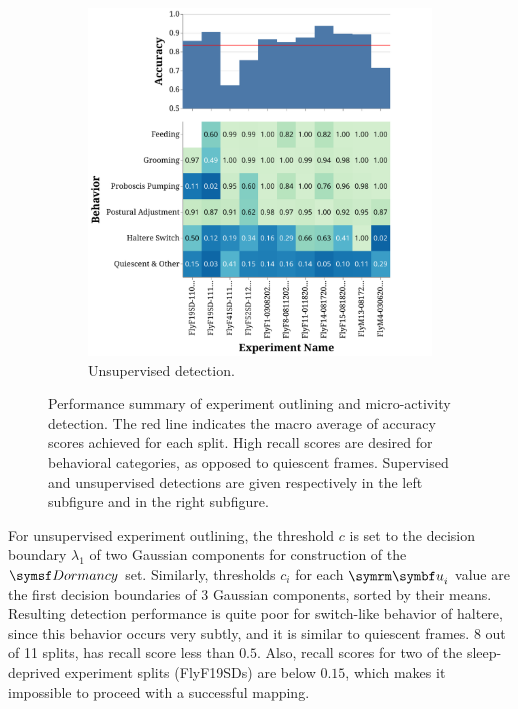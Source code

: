 \begin{figure}[htb!]
\begin{subfigure}[b]{0.495\linewidth}
		\centering\includegraphics[width=\linewidth]{figures/OutliningPerformance-Unsupervised.pdf}
		\caption{Unsupervised detection.}
	\end{subfigure}%
	\caption[Performance summary of experiment outlining and micro-activity detection.]{Performance summary of experiment outlining and micro-activity detection.
		The red line indicates the macro average of accuracy scores achieved for each split.
		High recall scores are desired for behavioral categories, as opposed to quiescent frames.
		Supervised and unsupervised detections are given respectively in the left subfigure and in the right subfigure. \label{figure:outlining-performance}}
\end{figure}

For unsupervised experiment outlining, the threshold $c$ is set to the decision boundary $\lambda_1$ of two Gaussian components for construction of the $\Dormancy$ set.
Similarly, thresholds $c_i$ for each $\V{u}_i$ value are the first decision boundaries of $3$ Gaussian components, sorted by their means.
Resulting detection performance is quite poor for switch-like behavior of haltere, since this behavior occurs very subtly, and it is similar to quiescent frames.
8 out of 11 splits, has recall score less than $0.5$.
Also, recall scores for two of the sleep-deprived experiment splits (FlyF19SDs) are below $0.15$, which makes it impossible to proceed with a successful mapping.

